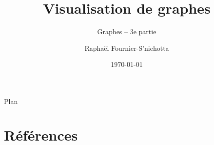 \documentclass[9pt,hyperref={pdfpagelabels=false}]{beamer}
\author[R. Fournier-S'niehotta]{Raphaël Fournier-S'niehotta}
\institute[CNAM]{CNAM Paris}
\date{\today}
\title[Visu Graphes]{Visualisation de graphes}
\subtitle{Graphes -- 3e partie}
\begin{document}


\begin{frame}{Plan}
  \tableofcontents[subsectionstyle=show]
\end{frame}



\section*{Références}

\end{document}
